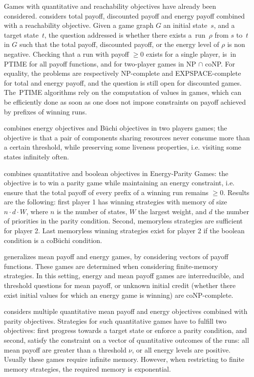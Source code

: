Games with quantitative and reachability objectives have already been
considered. \cite{Chatterjee0H17} considers total payoff, discounted
payoff and energy payoff combined with a reachability objective. Given
a game graph $G$ an initial state~$s$, and a target state~$t$, the
question addressed is whether there exists a~run~$\rho$ from $s$
to~$t$ in $G$ such that the total payoff, discounted payoff, or the
energy level of $\rho$ is non negative. Checking that a run with
payoff $\geq 0$ exists for a single player, is~in~ PTIME for all payoff functions, and for
two-player games in NP $\cap$ coNP. For equality, the problems are
respectively NP-complete and EXPSPACE-complete for total and
energy payoff, and the question is still open for discounted
games. The~PTIME algorithms rely on the computation of values in
games, which can be efficiently done as soon as one does not impose
constraints on payoff achieved by prefixes of winning runs.

\cite{CdAHS03} combines energy objectives and B\"uchi objectives in
two players games; the objective is that a pair of components sharing
resources never consume more than a certain threshold, while
preserving some liveness properties, i.e. visiting some states
infinitely often.

\cite{ChatterjeeD12} combines quantitative and boolean objectives in
Energy-Parity Games: the objective is to win a parity game while
maintaining an energy constraint, i.e. ensure that the total payoff of
every prefix of a winning run remains $\geq 0$. Results are the following: first player 1 has winning strategies with memory of
size $n\cdot d \cdot W$, where $n$ is the number of states, $W$ the
largest weight, and $d$ the number of priorities in the parity
condition. Second, memoryless strategies are sufficient for player 2. Last
memoryless winning strategies exist for player 2 if the boolean condition
is a coB\"uchi condition.

\cite{ChatterjeeDHR10} generalizes mean payoff and energy games, by considering vectors of payoff functions.
These games are determined when considering finite-memory
strategies. In this setting, energy and mean payoff games are
interreducible, and threshold questions for mean payoff, or unknown
initial credit (whether there exist initial values for which an energy
game is winning) are coNP-complete.

\cite{ChatterjeeRR14} considers multiple quantitative mean payoff and
energy objectives
combined with parity objectives.  Strategies for such quantitative
games have to fulfill two objectives: first progress towards a target
state or enforce a parity condition, and second, satisfy the
constraint on a vector of quantitative outcomes of the runs: all mean
payoff are greater than a threshold $\nu$, or all energy levels are
positive. Usually these games require infinite memory. However, when
restricting to finite memory strategies, the required memory is
exponential.

